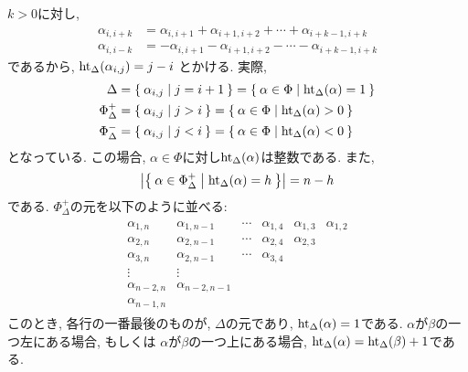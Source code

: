 $k>0$に対し,
\begin{align*}
\alpha_{i,i+k}&=\alpha_{i,i+1}+\alpha_{i+1,i+2}+\cdots+\alpha_{i+k-1,i+k}\\
\alpha_{i,i-k}&=-\alpha_{i,i+1}-\alpha_{i+1,i+2}-\cdots-\alpha_{i+k-1,i+k}
\end{align*}
であるから,
$\operatorname{ht}_\Delta(\alpha_{i,j})=j-i$
とかける.
実際,
\begin{align*}
\Delta&=\Set{\alpha_{i,j}|j=i+1}=\Set{\alpha\in\Phi|\operatorname{ht}_\Delta(\alpha)=1}\\
\Phi_\Delta^+&=\Set{\alpha_{i,j}|j>i}=\Set{\alpha\in\Phi|\operatorname{ht}_\Delta(\alpha)>0}\\
\Phi_\Delta^-&=\Set{\alpha_{i,j}|j<i}=\Set{\alpha\in\Phi|\operatorname{ht}_\Delta(\alpha)<0}
\end{align*}
となっている.
この場合, $\alpha\in\Phi$に対し$\operatorname{ht}_\Delta(\alpha)$は整数である.
また,
\begin{align*}
  \left|\Set{\alpha\in\Phi_\Delta^+ | \operatorname{ht}_\Delta(\alpha)=h}\right|
  =n-h
\end{align*}
である.
$\Phi_\Delta^+$の元を以下のように並べる:
\begin{align*}
  \begin{array}{cccccc}
    \alpha_{1,n}&\alpha_{1,n-1}&\cdots&\alpha_{1,4}&\alpha_{1,3}&\alpha_{1,2}\\
    \alpha_{2,n}&\alpha_{2,n-1}&\cdots&\alpha_{2,4}&\alpha_{2,3}\\
    \alpha_{3,n}&\alpha_{2,n-1}&\cdots&\alpha_{3,4}\\
    \vdots      &\vdots&&\\
    \alpha_{n-2,n}&\alpha_{n-2,n-1}\\
    \alpha_{n-1,n}
  \end{array}
\end{align*}
このとき, 各行の一番最後のものが, $\Delta$の元であり,
$\operatorname{ht}_\Delta(\alpha)=1$である.
$\alpha$が$\beta$の一つ左にある場合,
もしくは
$\alpha$が$\beta$の一つ上にある場合,
$\operatorname{ht}_\Delta(\alpha)=\operatorname{ht}_\Delta(\beta)+1$である.


